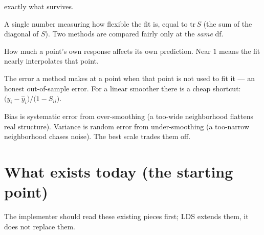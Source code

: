 \documentclass[11pt]{article}
\begin{document}
\begin{description}[leftmargin=0em,style=nextline]
exactly what survives.
\item[Degrees of freedom (df).] A single number measuring how flexible the fit is,
equal to $\mathrm{tr}\,S$ (the sum of the diagonal of $S$). Two methods are compared
fairly only at the \emph{same} df.
\item[Self-influence $S_{ii}$.] How much a point's own response affects its own
prediction. Near $1$ means the fit nearly interpolates that point.
\item[Leave-one-out (LOO) error.] The error a method makes at a point when that
point is not used to fit it --- an honest out-of-sample error. For a linear smoother
there is a cheap shortcut: $\big(y_i-\hat y_i\big)/\big(1-S_{ii}\big)$.
\item[Bias and variance.] Bias is systematic error from over-smoothing (a too-wide
neighborhood flattens real structure). Variance is random error from under-smoothing
(a too-narrow neighborhood chases noise). The best scale trades them off.
\end{description}

\section{What exists today (the starting point)}\label{sec:today}

The implementer should read these existing pieces first; LDS extends them, it does
not replace them.
\end{document}
